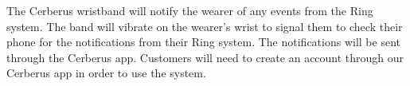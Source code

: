 The Cerberus wristband will notify the wearer of any events from the Ring system. The band will vibrate on the wearer's wrist to signal them to check their phone for the notifications from their Ring system. The notifications will be sent through the Cerberus app. Customers will need to create an account through our Cerberus app in order to use the system. 

